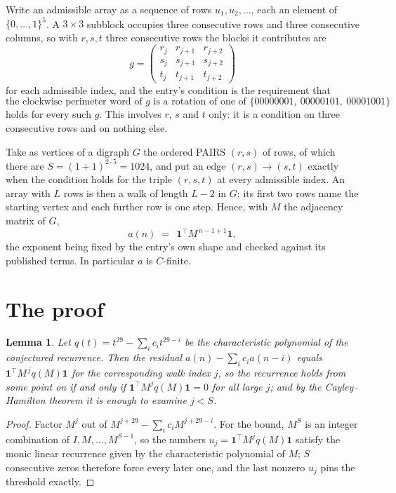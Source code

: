 \documentclass[11pt,a4paper]{article}
\theoremstyle{plain}
\newtheorem{lemma}[theorem]{Lemma}
\theoremstyle{definition}
\begin{document}
Write an admissible array as a sequence of rows $u_1,u_2,\dots$, each an element of
$\{0,\dots,1\}^{5}$. A $3\times3$ subblock occupies three consecutive rows and
three consecutive columns, so with $r,s,t$ three consecutive rows the blocks it
contributes are
\[
g=\begin{pmatrix}r_j&r_{j+1}&r_{j+2}\\ s_j&s_{j+1}&s_{j+2}\\ t_j&t_{j+1}&t_{j+2}\end{pmatrix}
\]
for each admissible index, and the entry's condition is the requirement that
\[
\text{the clockwise perimeter word of }g\text{ is a rotation of one of }\{00000001,\ 00000101,\ 00001001\}
\]
holds for every such $g$. This involves $r$, $s$ and $t$ only: it is a condition on
three consecutive rows and on nothing else.

Take as vertices of a digraph $G$ the ordered PAIRS $(r,s)$ of rows, of which there are
$S=(1+1)^{2\cdot5}=1024$, and put an edge $(r,s)\to(s,t)$ exactly when the condition
holds for the triple $(r,s,t)$ at every admissible index. An array with $L$ rows is then a
walk of length $L-2$ in $G$: its first two rows name the starting vertex and each further
row is one step. Hence, with $M$ the adjacency matrix of $G$,
\[
a(n)\;=\;\,\mathbf{1}^{\!\top}M^{\,n-1+1}\mathbf{1},
\]
the exponent being fixed by the entry's own shape and checked against its published terms.
In particular $a$ is $C$-finite.

\section{The proof}

\begin{lemma}\label{lem:crit}
Let $q(t)=t^{29}-\sum_i c_it^{29-i}$ be the characteristic polynomial of the
conjectured recurrence. Then the residual $a(n)-\sum_ic_ia(n-i)$ equals
$\mathbf{1}^{\!\top}M^{\,j}q(M)\mathbf{1}$ for the corresponding walk index
$j$, so the recurrence holds from some point on if and only if
$\mathbf{1}^{\!\top}M^{j}q(M)\mathbf{1}=0$ for all large $j$; and by the
Cayley--Hamilton theorem it is enough to examine $j<S$.
\end{lemma}

\begin{proof}
Factor $M^{j}$ out of $M^{j+29}-\sum_ic_iM^{j+29-i}$. For the bound, $M^{S}$
is an integer combination of $I,M,\dots,M^{S-1}$, so the numbers
$u_j=\mathbf{1}^{\!\top}M^{j}q(M)\mathbf{1}$ satisfy the monic linear recurrence given by
the characteristic polynomial of $M$; $S$ consecutive zeros therefore force every later one,
and the last nonzero $u_j$ pins the threshold exactly.
\end{proof}
\end{document}
